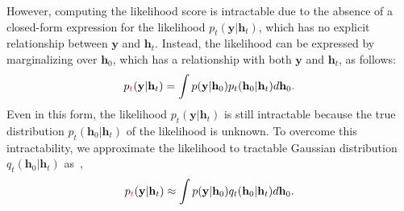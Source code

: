 \documentclass[lettersize,journal]{IEEEtran}
\newcommand{\tred}{\textcolor{red}}
\begin{document}
However, computing the likelihood score is intractable due to the absence of a closed-form expression for the likelihood $p_{t}(\mathbf{y}|\mathbf{h}_{t})$, which has no explicit relationship between $\mathbf{y}$ and $\mathbf{h}_{t}$. Instead, the likelihood can be expressed by marginalizing over $\mathbf{h}_{0}$, which has a relationship with both $\mathbf{y}$ and $\mathbf{h}_{t}$, as follows:
\begin{equation}
p_{\tred{t}}(\mathbf{y}|\mathbf{h}_{t}) = \int p(\mathbf{y}|\mathbf{h}_{0})p_{t}(\mathbf{h}_{0}|\mathbf{h}_{t})d\mathbf{h}_{0}\tred{.}
\end{equation}
Even in this form, the likelihood $p_{t}(\mathbf{y}|\mathbf{h}_{t})$ is still intractable because the true distribution $p_{t}(\mathbf{h}_{0}|\mathbf{h}_{t})$ of the likelihood is unknown. To overcome this intractability, we approximate the likelihood to tractable Gaussian distribution $q_{t}(\mathbf{h}_{0}|\mathbf{h}_{t})$ as~\cite{arvinteMIMOChannelEstimation2023,zhouGenerativeDiffusionModels2025},
\begin{equation}
p_{\tred{t}}(\mathbf{y}|\mathbf{h}_{t}) \approx \int p(\mathbf{y}|\mathbf{h}_{0})q_{t}(\mathbf{h}_{0}|\mathbf{h}_{t})d\mathbf{h}_{0}.
\end{equation}
\end{document}
